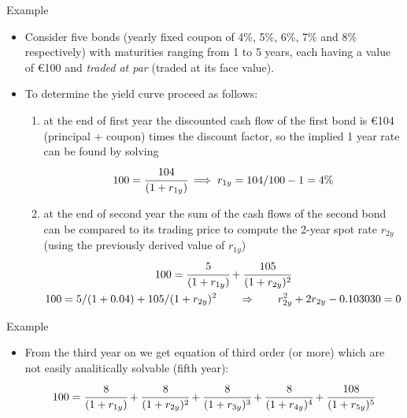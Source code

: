 \documentclass{beamer}
\begin{document}
\begin{frame}[fragile]{Example}
\begin{itemize}
\item Consider five bonds (yearly fixed coupon of 4\%, 5\%, 6\%, 7\% and 8\% respectively) with maturities ranging from 1 to 5 years, each having a value of €100 and \emph{traded at par} (traded at its face value). 
\item To determine the yield curve proceed as follows:
\begin{enumerate}
   \item at the end of first year the discounted cash flow of the first bond is €104 (principal + coupon) times the discount factor, so the implied 1 year rate can be found by solving
   \begin{equation*}
 100 = \cfrac{104}{(1 + r_{1y})}\implies r_{1y} =  104/100 - 1 = 4\%
 \end{equation*}
 \item at the end of second year the sum of the cash flows of the second bond can be compared to its trading price to compute the 2-year spot rate $r_{2y}$ (using the previously derived value of $r_{1y}$)
    \begin{equation*}
    \begin{gathered}
 100 = \cfrac{5}{(1 + r_{1y})} + \cfrac{105}{(1 + r_{2y})^{2}} \\
 100 = 5 / (1 + 0.04) + 105 / (1 + r_{2y})^{2}\qquad\Rightarrow\qquad r_{2y}^2  + 2 r_{2y}  - 0.103030 = 0
 \end{gathered}
 \end{equation*}
 \end{enumerate}
 \end{itemize}
\end{frame}
 
\begin{frame}[fragile]{Example}
\begin{itemize}
 This second order equation can be solved either by hand or with \texttt{numpy.roots}.
 \begin{equation*}
    r_{2y} = - 1 \pm \sqrt{1 + 0.103030} = \begin{cases}-2.05023 \\ 0.0502\end{cases}
    \end{equation*}
    
 \begin{ipython}
import numpy as np
np.roots([1, 2, -0.103030])
 \end{ipython}
 \begin{ioutput}
 array([-2.05025235,  0.05025235])
\end{ioutput}
\item From the third year on we get equation of third order (or more) which are not easily analitically solvable (fifth year):
 \begin{equation*}
 100 = \cfrac{8} {(1 + r_{1y})} + \cfrac{8} {(1 + r_{2y})^{2}}+ \cfrac{8} {(1 + r_{3y})^{3}} + \cfrac{8} {(1 + r_{4y})^{4}} + \cfrac{108} {(1 + r_{5y})^{5}}
 \end{equation*}
\end{itemize}
\end{frame}  
 
\end{document}

